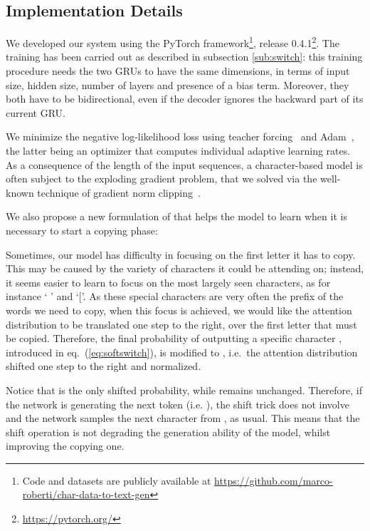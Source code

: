 \documentclass[runningheads, envcountsame, a4paper]{llncs}
\begin{document}
\subsection{Implementation Details}
We developed our system using the PyTorch framework\footnote{Code and datasets are publicly available at \url{https://github.com/marco-roberti/char-data-to-text-gen}}, release 0.4.1\footnote{\url{https://pytorch.org/}}.
The training has been carried out as described in subsection \ref{sub:switch}: this training procedure needs the two GRUs to have the same dimensions, in terms of input size, hidden size, number of layers and presence of a bias term. Moreover, they both have to be bidirectional, even if the decoder ignores the backward part of its current GRU. 

We minimize the negative log-likelihood loss using teacher forcing~\cite{Williams:89} and Adam~\cite{Kingma:14}, the latter being an optimizer that computes individual adaptive learning rates. As a consequence of the length of the input sequences, a character-based model is often subject to the exploding gradient problem, that we solved via the well-known technique of gradient norm clipping~\cite{Pascanu:13}.

We also propose a new formulation of  that helps the model to learn when it is necessary to start a copying phase:



Sometimes, our model has difficulty in focusing on the first letter it has to copy. This may be caused by the variety of characters it could be attending on; instead, it seems easier to learn to focus on the most largely seen characters, as for instance ` ' and `['. As these special characters are very often the prefix of the words we need to copy, when this focus is achieved, we would like the attention distribution to be translated one step to the right, over the first letter that must be copied. Therefore, the final probability of outputting a specific character , introduced in eq.~(\ref{eq:softswitch}), is modified to , i.e.~the attention distribution shifted one step to the right and normalized.

Notice that  is the only shifted probability, while  remains unchanged. Therefore, if the network is generating the next token (i.e.  ), the shift trick does not involve  and the network samples the next character from , as usual. This means that the shift operation is not degrading the generation ability of the model, whilst improving the copying one.
\end{document}
